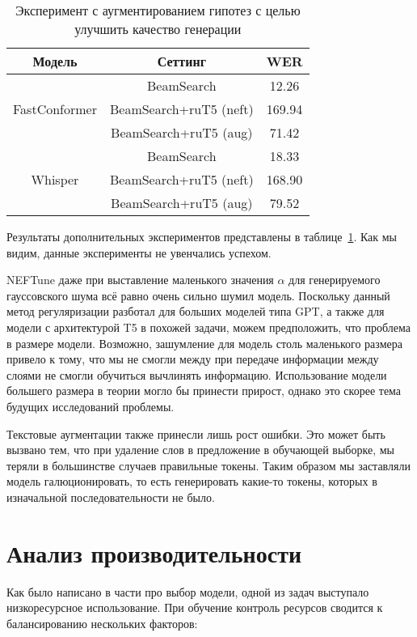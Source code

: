 \begin{table}[]
\centering
\caption{Эксперимент с аугментированием гипотез с целью улучшить качество генерации}
\begin{tabular}{|c|c|c|}
\hline
Модель                         & Сеттинг                              & WER     \\ \hline
\multirow{3}{*}{FastConformer} & BeamSearch                           & 12.26   \\ \cline{2-3} 
                               & BeamSearch+ruT5 (neft)               & 169.94  \\ \cline{2-3} 
                               & BeamSearch+ruT5 (aug)                & 71.42   \\ \hline
\multirow{3}{*}{Whisper}       & BeamSearch                           & 18.33   \\ \cline{2-3} 
                               & BeamSearch+ruT5 (neft)               & 168.90  \\ \cline{2-3} 
                               & BeamSearch+ruT5 (aug)                & 79.52   \\ \hline
\end{tabular}
\label{tab:fails}
\end{table}

Результаты дополнительных экспериментов представлены в таблице~\ref{tab:fails}.
Как мы видим, данные эксперименты не увенчались успехом.

NEFTune даже при выставление маленького значения $\alpha$ для генерируемого гауссовского шума всё равно очень сильно шумил модель.
Поскольку данный метод регуляризации разботал для больших моделей типа GPT\cite{jain2023neftune}, а также для модели с архитектурой T5 в похожей задачи\cite{iudinenhancing}, можем предположить, что проблема в размере модели.
Возможно, зашумление для модель столь маленького размера привело к тому, что мы не смогли между при передаче информации между слоями не смогли обучиться вычлинять информацию.
Использование модели большего размера в теории могло бы принести прирост, однако это скорее тема будущих исследований проблемы.

Текстовые аугментации также принесли лишь рост ошибки.
Это может быть вызвано тем, что при удаление слов в предложение в обучающей выборке, мы теряли в большинстве случаев правильные токены.
Таким образом мы заставляли модель галюционировать, то есть генерировать какие-то токены, которых в изначальной последовательности не было.

\section{Анализ производительности}
Как было написано в части про выбор модели, одной из задач выступало низкоресурсное использование.
При обучение контроль ресурсов сводится к балансированию нескольких факторов:


